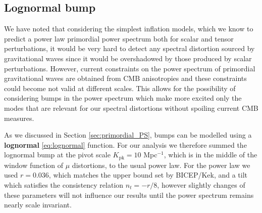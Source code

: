 %

\subsection{Lognormal bump}
We have noted that considering the simplest inflation models, which we know to predict a power law primordial power spectrum both for scalar and tensor perturbations, it would  be very hard to detect any spectral distortion sourced by gravitational waves since it would be overshadowed by those produced by scalar perturbations. However, current constraints on the power spectrum of primordial gravitational waves are obtained from CMB anisotropies and these constraints could become not valid at different scales. This allows for the possibility of considering bumps in the power spectrum which make more excited only the modes that are relevant for our spectral distortions without spoiling current CMB measures.

As we discussed in Section \ref{sec:primordial_PS}, bumps can be modelled using a \textbf{lognormal} \eqref{eq:lognormal} function. For our analysis we therefore summed the lognormal bump at the pivot scale $K_\text{pk}=10$ Mpc$^{-1}$, which is in the middle of the window function of $\mu$ distortions, to the usual power law. For the power law we used $r=0.036$, which matches the upper bound set by BICEP/Kek\cite{Ade_2021}, and a tilt which satisfies the consistency relation $n_t=-r/8$, however slightly changes of these parameters will not influence our results until the power spectrum remains nearly scale invariant. 

